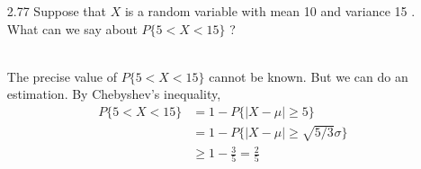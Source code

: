 \documentclass[en,hazy,blue,12pt,device = normal]{elegantnote}
\newcommand{\idty}[1]{\mathbbm{1}_{#1}}
\begin{document}
\begin{enumerate}
\begin{tcolorbox}
        (c) Since that \(\idty{i}\) are independent,
        \begin{align*}
            \Var{A} = \sumi \Var{\idty{i}} = \sumi \left(1/i \times (i-1)/i\right)
        \end{align*}

        (d) \begin{align*}
            \mean{N} &= \sumn \left(nP(n)\prod_{i = 1}^n \left(1-P(i)\right)\right)\\
            &= \sumn \frac 1 n \to \infty
        \end{align*}
    \end{tcolorbox}

    \item[2.77] Suppose that $X$ is a random variable with mean 10 and variance 15 . What can we say about $P\{5<X<15\}$ ?
    \begin{tcolorbox}
        \sol\\
        The precise value of \(P\{5<X<15\}\) cannot be known. But we can do an estimation. By Chebyshev's inequality,
        \begin{align*}
            P\{5<X<15\} &= 1 - P\{|X - \mu| \geq 5\} \\
            &= 1 - P\{|X - \mu | \geq \sqrt{5/3}\sigma\} \\
            &\geq 1 - \frac 3 5 = \frac 2 5
        \end{align*}
    \end{tcolorbox}


\end{enumerate}
\end{document}

